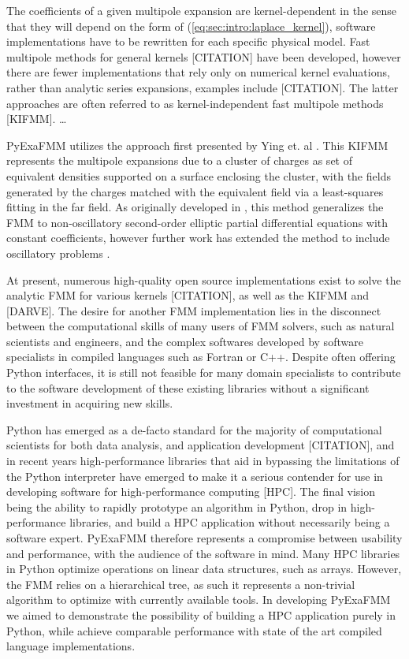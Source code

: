\documentclass{IEEEcsmag}
\begin{document}
The coefficients of a given multipole expansion are kernel-dependent in the sense that they will depend on the form of (\ref{eq:sec:intro:laplace_kernel}), software implementations have to be rewritten for each specific physical model. Fast multipole methods for general kernels [CITATION] have been developed, however there are fewer implementations that rely only on numerical kernel evaluations, rather than analytic series expansions, examples include [CITATION]. The latter approaches are often referred to as kernel-independent fast multipole methods [KIFMM]. \dots

PyExaFMM utilizes the approach first presented by Ying et. al \cite{Ying2004}. This KIFMM represents the multipole expansions due to a cluster of charges as set of equivalent densities supported on a surface enclosing the cluster, with the fields generated by the charges matched with the equivalent field via a least-squares fitting in the far field. As originally developed in \cite{Ying2004}, this method generalizes the FMM to non-oscillatory second-order elliptic partial differential equations with constant coefficients, however further work has extended the method to include oscillatory problems \cite{Engquist2007}.

At present, numerous high-quality open source implementations exist to solve the analytic FMM for various kernels [CITATION], as well as the KIFMM \cite{Ying2004} and [DARVE].
The desire for another FMM implementation lies in the disconnect between the computational skills of many users of FMM solvers, such as natural scientists and engineers, and the complex softwares developed by software specialists in compiled languages such as Fortran or C++. Despite often offering Python interfaces, it is still not feasible for many domain specialists to contribute to the software development of these existing libraries without a significant investment in acquiring new skills.

Python has emerged as a de-facto standard for the majority of computational scientists for both data analysis, and application development [CITATION], and in recent years high-performance libraries that aid in bypassing the limitations of the Python interpreter have emerged to make it a serious contender for use in developing software for high-performance computing [HPC]. The final vision being the ability to rapidly prototype an algorithm in Python, drop in high-performance libraries, and build a HPC application without necessarily being a software expert. PyExaFMM therefore represents a compromise between usability and performance, with the audience of the software in mind. Many HPC libraries in Python optimize operations on linear data structures, such as arrays. However, the FMM relies on a hierarchical tree, as such it represents a non-trivial algorithm to optimize with currently available tools. In developing PyExaFMM we aimed to demonstrate the possibility of building a HPC application purely in Python, while achieve comparable performance with state of the art compiled language implementations.
\end{document}
